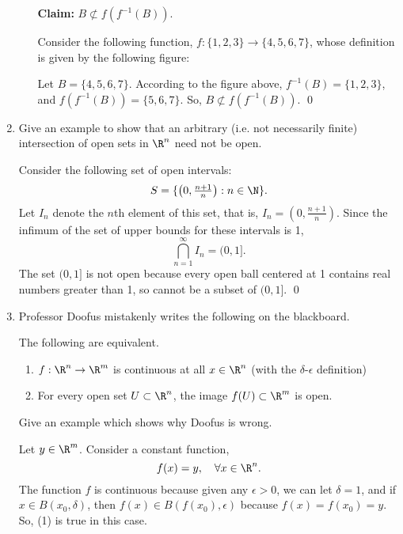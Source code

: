 \documentclass[letterpaper]{article}
\begin{document}
\begin{enumerate}
\begin{enumerate}[label=(\alph*)]
\textbf{Claim:} $B \not\subset f(f^{-1}(B))$.
\begin{example*} Consider the following function, $f:\{1,2,3\} \to \{4,5,6,7\}$, whose definition is given by the following figure:
\begin{center}
\end{center}
Let $B=\{4,5,6,7\}$. According to the figure above, $f^{-1}(B)=\{1,2,3\}$, and $f(f^{-1}(B))=\{5,6,7\}$. So, $B \not\subset f(f^{-1}(B))$.  \qed
\end{example*}
\end{enumerate}

\pagebreak
\item Give an example to show that an arbitrary (i.e. not necessarily finite) intersection of open sets in $\R^n$ need not be open. 
\begin{example*}
Consider the following set of open intervals:
$$S = \{ \left(0,\tfrac{n+1}{n}\right) : n \in \N \}.$$ 
Let $I_n$ denote the $n$th element of this set, that is, $I_n=(0,\tfrac{n+1}{n})$. Since the infimum of the set of upper bounds for these intervals is 1, 
$$\bigcap_{n=1}^{\infty}I_n=(0,1].$$
The set $(0,1]$ is not open because every open ball centered at 1 contains real numbers greater than 1, so cannot be a subset of $(0,1]$.
\qed
\end{example*}

\item Professor Doofus mistakenly writes the following on the blackboard.
\begin{romantheorem*}The following are equivalent.
\begin{enumerate}[label=(\arabic*)]
\item $f:\R^n \to \R^m$ is continuous at all $x \in \R^n$ (with the $\delta$-$\epsilon$ definition)
\item For every open set $U \subset \R^n$, the image $f(U) \subset \R^m$ is open. 
\end{enumerate}
\end{romantheorem*}
Give an example which shows why Doofus is wrong. 
\begin{example*}
Let $y \in \R^m$. Consider a constant function, $$f(x)=y, \quad \forall x \in \R^n.$$ 
The function $f$ is continuous because given any $\epsilon > 0$, we can let $\delta=1$, and if $x \in B(x_0, \delta)$, then $f(x) \in B(f(x_0), \epsilon)$ because $f(x)=f(x_0)=y$. So, (1) is true in this case. 


\end{example*}
\end{enumerate}
\end{document}
